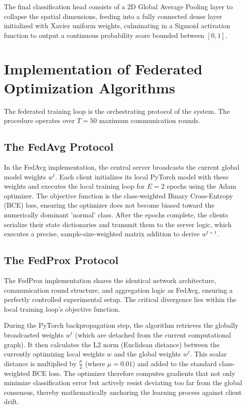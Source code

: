 \documentclass[12pt,a4paper]{report}
\begin{document}
The final classification head consists of a 2D Global Average Pooling layer to collapse the spatial dimensions, feeding into a fully connected dense layer initialized with Xavier uniform weights, culminating in a Sigmoid activation function to output a continuous probability score bounded between $[0, 1]$.

\section{Implementation of Federated Optimization Algorithms}

The federated training loop is the orchestrating protocol of the system. The procedure operates over $T = 50$ maximum communication rounds.

\subsection{The FedAvg Protocol}
In the FedAvg implementation, the central server broadcasts the current global model weights $w^t$. Each client initializes its local PyTorch model with these weights and executes the local training loop for $E = 2$ epochs using the Adam optimizer. The objective function is the class-weighted Binary Cross-Entropy (BCE) loss, ensuring the optimizer does not become biased toward the numerically dominant 'normal' class. After the epochs complete, the clients serialize their state dictionaries and transmit them to the server logic, which executes a precise, sample-size-weighted matrix addition to derive $w^{t+1}$.

\subsection{The FedProx Protocol}
The FedProx implementation shares the identical network architecture, communication round structure, and aggregation logic as FedAvg, ensuring a perfectly controlled experimental setup. The critical divergence lies within the local training loop's objective function. 

During the PyTorch backpropagation step, the algorithm retrieves the globally broadcasted weights $w^t$ (which are detached from the current computational graph). It then calculates the L2 norm (Euclidean distance) between the currently optimizing local weights $w$ and the global weights $w^t$. This scalar distance is multiplied by $\frac{\mu}{2}$ (where $\mu = 0.01$) and added to the standard class-weighted BCE loss. The optimizer therefore computes gradients that not only minimize classification error but actively resist deviating too far from the global consensus, thereby mathematically anchoring the learning process against client drift.
\end{document}
